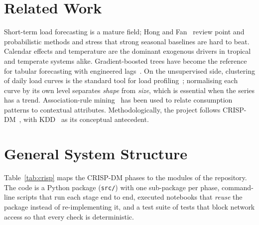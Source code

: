 \documentclass[conference,10pt]{IEEEtran}
\begin{document}
\section{Related Work}
Short-term load forecasting is a mature field; Hong and Fan~\cite{hong2016} review point and probabilistic methods and stress that strong seasonal baselines are hard to beat. Calendar effects and temperature are the dominant exogenous drivers in tropical and temperate systems alike. Gradient-boosted trees have become the reference for tabular forecasting with engineered lags~\cite{ke2017}. On the unsupervised side, clustering of daily load curves is the standard tool for load profiling~\cite{chicco2012}; normalising each curve by its own level separates \emph{shape} from \emph{size}, which is essential when the series has a trend. Association-rule mining~\cite{agrawal1994} has been used to relate consumption patterns to contextual attributes. Methodologically, the project follows CRISP-DM~\cite{chapman2000}, with KDD~\cite{fayyad1996} as its conceptual antecedent.

\section{General System Structure}\label{sec:sistema}
Table~\ref{tab:crisp} maps the CRISP-DM phases to the modules of the repository. The code is a Python package (\texttt{src/}) with one sub-package per phase, command-line scripts that run each stage end to end, executed notebooks that \emph{reuse} the package instead of re-implementing it, and a test suite of \nPruebas{} tests that block network access so that every check is deterministic.
\end{document}

